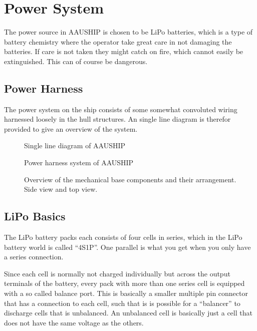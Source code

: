 \section{Power System}

The power source in AAUSHIP is chosen to be LiPo batteries, which is
a type of battery chemistry where the operator take great care in not damaging
the batteries. If care is not taken they might catch on fire, which
cannot easily be extinguished. This can of course be dangerous.

\subsection{Power Harness}
The power system on the ship consists of some somewhat convoluted
wiring harnessed loosely in the hull structures. An single line
diagram is therefor provided to give an overview of the system.

\begin{figure}[htbp]
	
	\caption{Single line diagram of AAUSHIP}
	\label{fig:sld}
\end{figure}

\begin{figure}[htbp]
	
	\caption{Power harness system of AAUSHIP}
	\label{fig:harness}
\end{figure}

\begin{figure}[htbp]
	
	\caption{Overview of the mechanical base components and their
	arrangement. Side view and top view.}
	\label{fig:mechanical}
\end{figure}

\subsection{LiPo Basics}
The LiPo battery packs each consists of four cells in series, which in
the LiPo battery world is called ``4S1P''. One parallel is what you get
when you only have a series connection.

Since each cell is normally not charged individually but across the
output terminals of the battery, every pack with more than one series
cell is equipped with a so called balance port. This is basically a
smaller multiple pin connector that has a connection to each cell,
such that is is possible for a ``balancer'' to discharge cells that is
unbalanced. An unbalanced cell is basically just a cell that does not
have the same voltage as the others.

